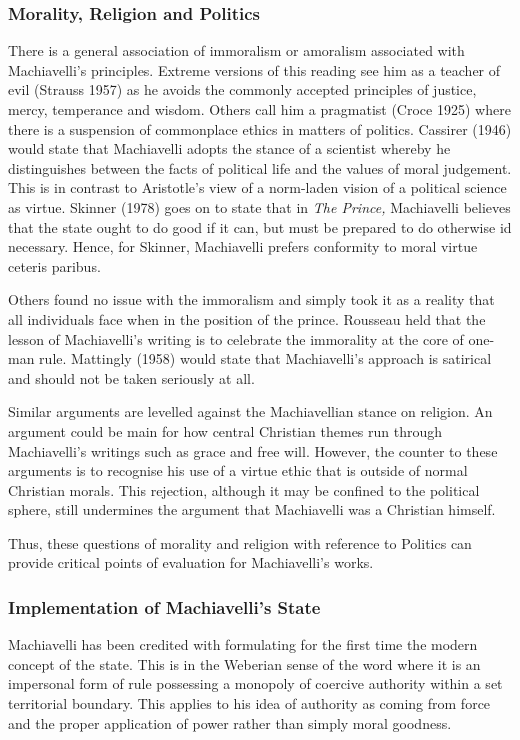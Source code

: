 \documentclass[12pt, letterpaper]{article}
\begin{document}
\subsubsection{Morality, Religion and Politics}
There is a general association of immoralism or amoralism associated with Machiavelli's principles. Extreme versions of this reading see him as a teacher of evil (Strauss 1957) as he avoids the commonly accepted principles of justice, mercy, temperance and wisdom. Others call him a pragmatist (Croce 1925) where there is a suspension of commonplace ethics in matters of politics. Cassirer (1946) would state that Machiavelli adopts the stance of a scientist whereby he distinguishes between the facts of political life and the values of moral judgement. This is in contrast to Aristotle's view of a norm-laden vision of a political science as virtue. Skinner (1978) goes on to state that in \textit{The Prince,} Machiavelli believes that the state ought to do good if it can, but must be prepared to do otherwise id necessary. Hence, for Skinner, Machiavelli prefers conformity to moral virtue ceteris paribus.

Others found no issue with the immoralism and simply took it as a reality that all individuals face when in the position of the prince. Rousseau held that the lesson of Machiavelli's writing is to celebrate the immorality at the core of one-man rule. Mattingly (1958) would state that Machiavelli's approach is satirical and should not be taken seriously at all. 

Similar arguments are levelled against the Machiavellian stance on religion. An argument could be main for how central Christian themes run through Machiavelli's writings such as grace and free will. However, the counter to these arguments is to recognise his use of a virtue ethic that is outside of normal Christian morals. This rejection, although it may be confined to the political sphere, still undermines the argument that Machiavelli was a Christian himself.

Thus, these questions of morality and religion with reference to Politics can provide critical points of evaluation for Machiavelli's works. 

\subsubsection{Implementation of Machiavelli's State}
Machiavelli has been credited with formulating for the first time the modern concept of the state. This is in the Weberian sense of the word where it is an impersonal form of rule possessing a monopoly of coercive authority within a set territorial boundary. This applies to his idea of authority as coming from force and the proper application of power rather than simply moral goodness.
\end{document}
